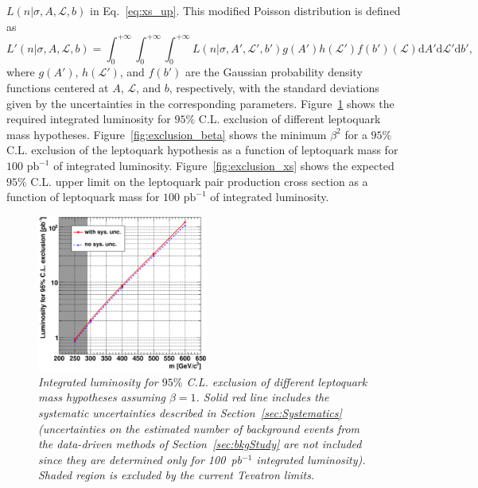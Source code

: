 $L(n|\sigma,A,\mathcal{L},b)$ in Eq.~\ref{eq:xs_up}. This modified Poisson distribution is defined as
\begin{equation}
L'(n|\sigma,A,\mathcal{L},b)=\int_0^{+\infty}\int_0^{+\infty}\int_0^{+\infty} L(n|\sigma,A',\mathcal{L}',b')g(A')h(\mathcal{L}')f(b')(\mathcal{L})\mathrm{d}A'\mathrm{d}\mathcal{L}'\mathrm{d}b',
\end{equation}
where $g(A')$, $h(\mathcal{L}')$, and $f(b')$ are the Gaussian probability density functions centered at $A$, $\mathcal{L}$, and $b$, respectively,
with the standard deviations given by the uncertainties in the corresponding parameters. Figure~\ref{fig:exclusion}
shows the required integrated luminosity for $95\%$ C.L. exclusion of different leptoquark mass hypotheses. 
Figure~\ref{fig:exclusion_beta} shows the minimum $\beta^2$ for a $95\%$ C.L. exclusion of the leptoquark hypothesis 
as a function of leptoquark mass for $100\text{ pb}^{-1}$ of integrated luminosity.
Figure~\ref{fig:exclusion_xs}
shows the expected $95\%$ C.L. upper limit on the leptoquark pair production cross section as a function of leptoquark mass for $100\text{ pb}^{-1}$
of integrated luminosity. 

\begin{figure}[h!]
 \centering
  \includegraphics[width=0.5\textwidth]{plots/cmsPotential/L95CL_vs_m_log.eps}
 \caption{\small \sl Integrated luminosity
for $95\%$ C.L. exclusion of different leptoquark mass hypotheses assuming $\beta=1$. 
Solid red line includes the systematic uncertainties described in Section~\ref{sec:Systematics}
(uncertainties on the estimated number of background events from the data-driven methods
of Section~\ref{sec:bkgStudy} are not included since they are determined only for 100~pb$^{-1}$ integrated luminosity). 
Shaded region is excluded by the current Tevatron limits.\label{fig:exclusion}}
\end{figure}

